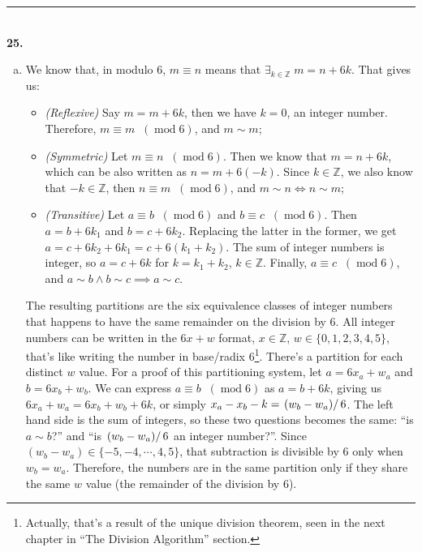 \documentclass{article}[10pt]
\newenvironment{exercise}[1]
    {\noindent\rule{2cm}{0.4pt} \\
     \textbf{#1.}}
    {}
\begin{document}
\begin{exercise}{25}
\begin{enumerate}[(a)]
    \item
      We know that, in modulo $6$, $m \equiv n$ means
      that $\exists_{k \in \mathds{Z}} \; m = n + 6 k$.
      That gives us:
      \begin{itemize}
        \item \emph{(Reflexive)}
          Say $m = m + 6 k$, then we have $k = 0$, an integer number.
          Therefore, $m \equiv m \;\; (\operatorname{mod} 6)$,
          and $m \sim m$;
        \item \emph{(Symmetric)}
          Let $m \equiv n \;\; (\operatorname{mod} 6)$.
          Then we know that $m = n + 6 k$,
          which can be also written as $n = m + 6 (-k)$.
          Since $k \in \mathds{Z}$,
          we also know that $-k \in \mathds{Z}$,
          then $n \equiv m \;\; (\operatorname{mod} 6)$,
          and $m \sim n \iff n \sim m$;
        \item \emph{(Transitive)}
          Let $a \equiv b \;\; (\operatorname{mod} 6)$
          and $b \equiv c \;\; (\operatorname{mod} 6)$.
          Then $a = b + 6 k_1$
          and $b = c + 6 k_2$.
          Replacing the latter in the former,
          we get $a = c + 6 k_2 + 6 k_1 = c + 6 (k_1 + k_2)$.
          The sum of integer numbers is integer,
          so $a = c + 6 k$
          for $k = k_1 + k_2$, $k \in \mathds{Z}$.
          Finally, $a \equiv c \;\; (\operatorname{mod} 6)$,
          and $a \sim b \land b \sim c \implies a \sim c$.
      \end{itemize}
      The resulting partitions are
      the six equivalence classes of integer numbers
      that happens to have the same remainder on the division by $6$.
      All integer numbers can be written in the $6 x + w$ format,
      $x \in \mathds{Z}$, $w \in \{0, 1, 2, 3, 4, 5\}$,
      that's like writing the number in base/radix $6$\footnote{
        Actually, that's a result of the unique division theorem,
        seen in the next chapter in ``The Division Algorithm''
        section.
      }.
      There's a partition for each distinct $w$ value.
      For a proof of this partitioning system,
      let $a = 6 x_a + w_a$ and $b = 6 x_b + w_b$.
      We can express $a \equiv b \;\; (\operatorname{mod} 6)$
      as $a = b + 6 k$,
      giving us $6 x_a + w_a = 6 x_b + w_b + 6 k$,
      or simply $x_a - x_b - k = \left. (w_b - w_a) \right/ 6$.
      The left hand side is the sum of integers,
      so these two questions becomes the same:
      ``is $a \sim b$?'' and
      ``is $\left. (w_b - w_a) \right/ 6$ an integer number?''.
      Since $(w_b - w_a) \in \{-5, -4, \cdots, 4, 5\}$,
      that subtraction is divisible by $6$ only when $w_b = w_a$.
      Therefore, the numbers are in the same partition
      only if they share the same $w$ value
      (the remainder of the division by $6$).

  \end{enumerate}
\end{exercise}
\end{document}

